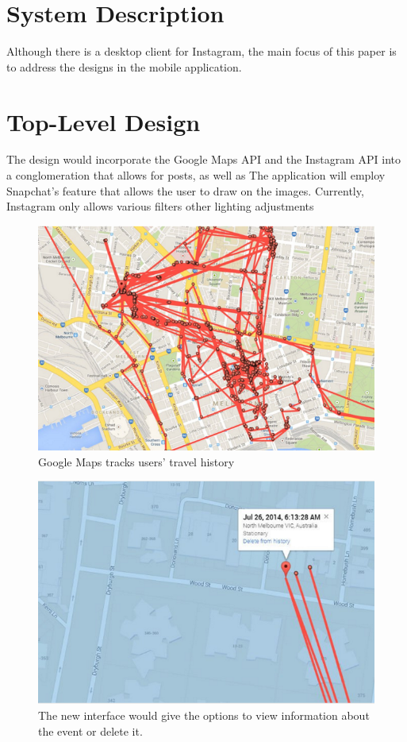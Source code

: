 \documentclass[11pt]{article}
\begin{document}
\section{System Description}
\label{System Description}
Although there is a desktop client for Instagram, the main focus of this paper is to address the designs in the mobile application. 

\pagebreak

\section{Top-Level Design}
\label{Top-Level Design}
The design would incorporate the Google Maps API and the Instagram API into a conglomeration that allows for posts, as well as 
The application will employ Snapchat's feature that allows the user to draw on the images. Currently, Instagram only allows various filters other lighting adjustments
\begin{figure}[ht]
\centering
\includegraphics[width=5in]{images/google_maps_tracking.png}
\caption{Google Maps tracks users' travel history}
\label{google_tracking}
\end{figure}

\begin{figure}[ht]
\centering
\includegraphics[width=5in]{images/google_maps_tracking_with_info.png}
\caption{The new interface would give the options to view information about the event or delete it.}
\label{google_tracking}
\end{figure}
\end{document}
